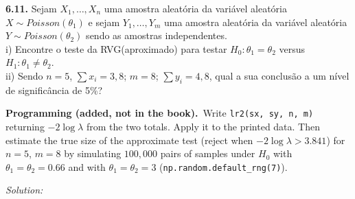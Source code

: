 \documentclass[11pt,a4paper]{article}
\newif\ifsolucoes
\newcommand{\espacoresol}{4.5cm}   %
\numberwithin{equation}{questao}   %
\newcommand{\programacao}{\par\smallskip\noindent\textbf{Programming (added, not in the book).}~}
\newcommand{\resolespaco}{\ifsolucoes\else\par\textit{Solution:}\vspace{\espacoresol}\par\fi}
\newcommand{\1}{\mathbf{1}}
\begin{document}
\begin{otherlanguage}{brazil}
\textbf{6.11.} Sejam $X_1,\dots,X_n$ uma amostra aleatória da variável aleatória $X\sim\mathit{Poisson}(\theta_1)$
e sejam $Y_1,\dots,Y_m$ uma amostra aleatória da variável aleatória $Y\sim\mathit{Poisson}(\theta_2)$
sendo as amostras independentes.\\
i) Encontre o teste da RVG(aproximado) para testar $H_0:\theta_1=\theta_2$ versus $H_1:\theta_1\neq\theta_2$.\\
ii) Sendo $n=5$, $\sum x_i=3,8$; $m=8$; $\sum y_i=4,8$, qual a sua conclusão a um nível de
significância de 5\%?
\end{otherlanguage}
\programacao Write \texttt{lr2(sx, sy, n, m)} returning $-2\log\lambda$ from the two totals. Apply it
to the printed data. Then estimate the true size of the approximate test (reject when
$-2\log\lambda>3.841$) for $n=5$, $m=8$ by simulating $100{,}000$ pairs of samples under $H_0$ with
$\theta_1=\theta_2=0.66$ and with $\theta_1=\theta_2=3$ (\texttt{np.random.default\_rng(7)}).
\resolespaco
\end{document}
